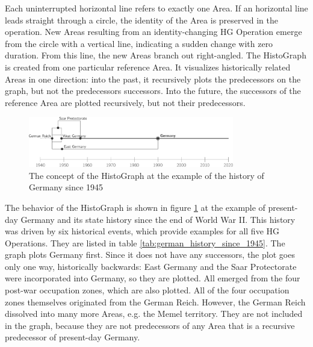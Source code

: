 \vspace{-1em}

Each uninterrupted horizontal line refers to exactly one Area. If an horizontal line leads straight through a circle, the identity of the Area is preserved in the operation. New Areas resulting from an identity-changing HG Operation emerge from the circle with a vertical line, indicating a sudden change with zero duration. From this line, the new Areas branch out right-angled. The HistoGraph is created from one particular reference Area. It visualizes historically related Areas in one direction: into the past, it recursively plots the predecessors on the graph, but not the predecessors successors. Into the future, the successors of the reference Area are plotted recursively, but not their predecessors.

\begin{figure}[ht]
  \vspace{0.5em}
  \centering
  \includegraphics[width=0.8\textwidth]{graphics/development/histograph/example_germany}
  \caption{The concept of the HistoGraph at the example of the history of Germany since 1945}
  \label{fig:example_germany}
\end{figure}

The behavior of the HistoGraph is shown in figure \ref{fig:example_germany} at the example of present-day Germany and its state history since the end of World War II. This history was driven by six historical events, which provide examples for all five HG Operations. They are listed in table \ref{tab:german_history_since_1945}. The graph plots Germany first. Since it does not have any successors, the plot goes only one way, historically backwards: East Germany and the Saar Protectorate were incorporated into Germany, so they are plotted. All emerged from the four post-war occupation zones, which are also plotted. All of the four occupation zones themselves originated from the German Reich. However, the German Reich dissolved into many more Areas, e.g. the Memel territory. They are not included in the graph, because they are not predecessors of any Area that is a recursive predecessor of present-day Germany.

